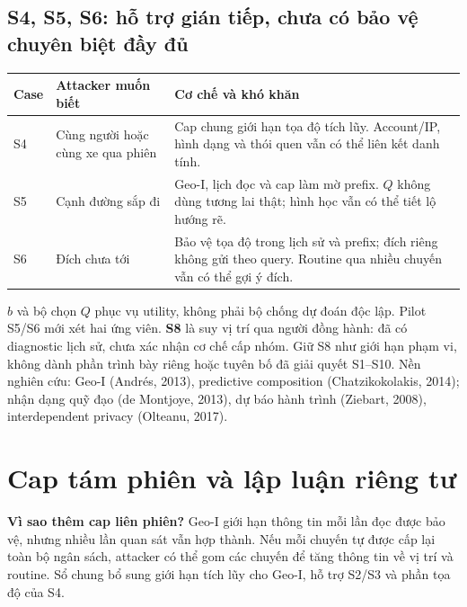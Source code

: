 \documentclass[10pt,a4paper]{article}
\begin{document}
\subsection{S4, S5, S6: hỗ trợ gián tiếp, chưa có bảo vệ chuyên biệt đầy đủ}
\par\smallskip
\begin{tabularx}{\linewidth}{@{}P{.8cm}P{3.25cm}Y@{}}\toprule
\textbf{Case} & \textbf{Attacker muốn biết} & \textbf{Cơ chế và khó khăn}\\\midrule
S4 & Cùng người hoặc cùng xe qua phiên & Cap chung giới hạn tọa độ tích lũy. Account/IP, hình dạng và thói quen vẫn có thể liên kết danh tính.\\
S5 & Cạnh đường sắp đi & Geo-I, lịch đọc và cap làm mờ prefix. $Q$ không dùng tương lai thật; hình học vẫn có thể tiết lộ hướng rẽ.\\
S6 & Đích chưa tới & Bảo vệ tọa độ trong lịch sử và prefix; đích riêng không gửi theo query. Routine qua nhiều chuyến vẫn có thể gợi ý đích.\\\bottomrule
\end{tabularx}

$b$ và bộ chọn $Q$ phục vụ utility, không phải bộ chống dự đoán độc lập. Pilot S5/S6 mới xét hai ứng viên.
\textbf{S8} là suy vị trí qua người đồng hành: đã có diagnostic lịch sử, chưa xác nhận cơ chế cấp nhóm.
Giữ S8 như giới hạn phạm vi, không dành phần trình bày riêng hoặc tuyên bố đã giải quyết S1--S10.
{\small\color{gray}Nền nghiên cứu: Geo-I (Andrés, 2013), predictive composition (Chatzikokolakis, 2014);
nhận dạng quỹ đạo (de Montjoye, 2013), dự báo hành trình (Ziebart, 2008), interdependent privacy (Olteanu, 2017).}

\clearpage
\section{Cap tám phiên và lập luận riêng tư}
\textbf{Vì sao thêm cap liên phiên?} Geo-I giới hạn thông tin mỗi lần đọc được bảo vệ, nhưng nhiều lần quan sát vẫn hợp thành.
Nếu mỗi chuyến tự được cấp lại toàn bộ ngân sách, attacker có thể gom các chuyến để tăng thông tin về vị trí và routine.
Sổ chung bổ sung giới hạn tích lũy cho Geo-I, hỗ trợ S2/S3 và phần tọa độ của S4.
\end{document}
